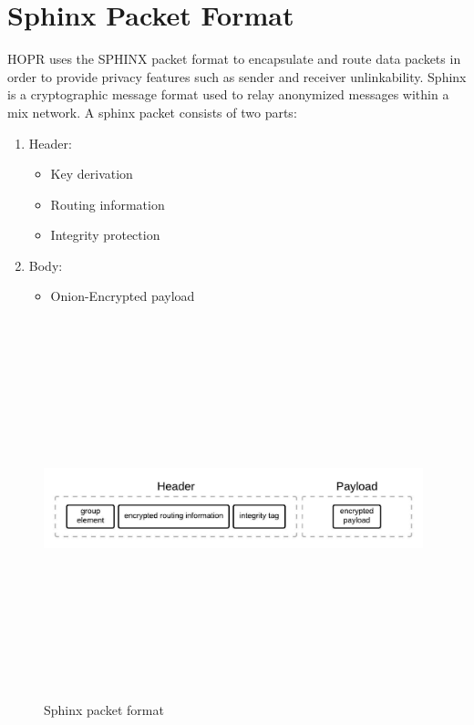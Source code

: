 \section{Sphinx Packet Format}

HOPR uses the SPHINX packet format to encapsulate and route data packets in order to provide privacy features such as sender and receiver unlinkability.
Sphinx is a cryptographic message format used to relay anonymized messages within a mix network. A sphinx packet consists of two parts:

\begin{enumerate}
\item Header:
\begin{itemize}
\item Key derivation
\item Routing information
\item Integrity protection
\end{itemize}
\item Body:
\begin{itemize}
\item Onion-Encrypted payload
\end{itemize}
\end{enumerate}
\begin{figure}[H]
    \centering
    \includegraphics[width=11cm,height=11cm,keepaspectratio]{../yellowpaper/images/sphinx.jpeg}
    \caption{Sphinx packet format}
    \label{fig:Sphinx packet format}
\end{figure}
